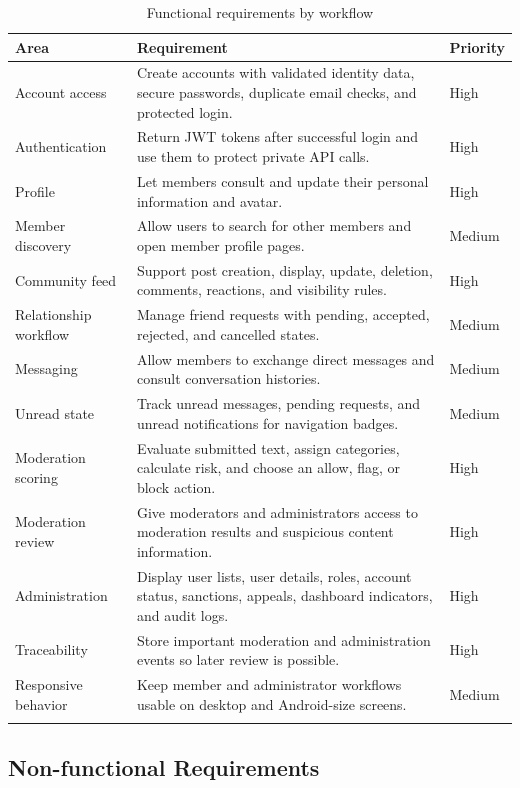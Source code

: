 \begin{longtable}{|m{3.1cm}|m{8.8cm}|m{2cm}|}
\hline
\textbf{Area} & \textbf{Requirement} & \textbf{Priority} \\
\hline
Account access & Create accounts with validated identity data, secure passwords, duplicate email checks, and protected login. & High \\
\hline
Authentication & Return JWT tokens after successful login and use them to protect private API calls. & High \\
\hline
Profile & Let members consult and update their personal information and avatar. & High \\
\hline
Member discovery & Allow users to search for other members and open member profile pages. & Medium \\
\hline
Community feed & Support post creation, display, update, deletion, comments, reactions, and visibility rules. & High \\
\hline
Relationship workflow & Manage friend requests with pending, accepted, rejected, and cancelled states. & Medium \\
\hline
Messaging & Allow members to exchange direct messages and consult conversation histories. & Medium \\
\hline
Unread state & Track unread messages, pending requests, and unread notifications for navigation badges. & Medium \\
\hline
Moderation scoring & Evaluate submitted text, assign categories, calculate risk, and choose an allow, flag, or block action. & High \\
\hline
Moderation review & Give moderators and administrators access to moderation results and suspicious content information. & High \\
\hline
Administration & Display user lists, user details, roles, account status, sanctions, appeals, dashboard indicators, and audit logs. & High \\
\hline
Traceability & Store important moderation and administration events so later review is possible. & High \\
\hline
Responsive behavior & Keep member and administrator workflows usable on desktop and Android-size screens. & Medium \\
\hline
\caption{Functional requirements by workflow}
\end{longtable}

\subsection{Non-functional Requirements}

